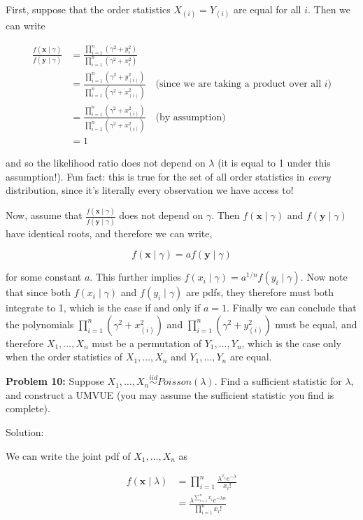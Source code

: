 \documentclass[
  letterpaper,
  DIV=11,
  numbers=noendperiod]{scrreprt}
\begin{document}
First, suppose that the order statistics \(X_{(i)} = Y_{(i)}\) are equal
for all \(i\). Then we can write

\begin{align*}
    \frac{f(\textbf{x} \mid \gamma)}{f(\textbf{y} \mid \gamma)} & = \frac{\prod_{i = 1}^n  (\gamma^2 + y_i^2)}{\prod_{i = 1}^n  (\gamma^2 + x_i^2)} \\
    & = \frac{\prod_{i = 1}^n  (\gamma^2 + y_{(i)}^2)}{\prod_{i = 1}^n  (\gamma^2 + x_{(i)}^2)} \quad \text{(since we are taking a product over all $i$)} \\
    & = \frac{\prod_{i = 1}^n  (\gamma^2 + x_{(i)}^2)}{\prod_{i = 1}^n  (\gamma^2 + x_{(i)}^2)} \quad \text{(by assumption)} \\
    & = 1
\end{align*}

and so the likelihood ratio does not depend on \(\lambda\) (it is equal
to 1 under this assumption!). Fun fact: this is true for the set of all
order statistics in \emph{every} distribution, since it's literally
every observation we have access to!

Now, assume that
\(\frac{f(\textbf{x} \mid \gamma)}{f(\textbf{y} \mid \gamma)}\) does not
depend on \(\gamma\). Then \(f(\textbf{x} \mid \gamma)\) and
\(f(\textbf{y} \mid \gamma)\) have identical roots, and therefore we can
write,

\[
f(\textbf{x} \mid \gamma)  = a f(\textbf{y} \mid \gamma)
\]

for some constant \(a\). This further implies
\(f(x_i \mid \gamma) = a^{1/n} f(y_i \mid \gamma)\). Now note that since
both \(f(x_i \mid \gamma)\) and \(f(y_i \mid \gamma)\) are pdfs, they
therefore must both integrate to 1, which is the case if and only if
\(a = 1\). Finally we can conclude that the polynomials
\(\prod_{i = 1}^n  (\gamma^2 + x_{(i)}^2)\) and
\(\prod_{i = 1}^n  (\gamma^2 + y_{(i)}^2)\) must be equal, and therefore
\(X_1, \dots, X_n\) must be a permutation of \(Y_1, \dots, Y_n\), which
is the case only when the order statistics of \(X_1, \dots, X_n\) and
\(Y_1, \dots, Y_n\) are equal.

\textbf{Problem 10:} Suppose
\(X_1, \dots, X_n \overset{iid}{\sim} Poisson(\lambda)\). Find a
sufficient statistic for \(\lambda\), and construct a UMVUE (you may
assume the sufficient statistic you find is complete).

Solution:

We can write the joint pdf of \(X_1, \dots, X_n\) as

\begin{align*}
    f(\textbf{x} \mid \lambda) & = \prod_{i = 1}^n \frac{\lambda^{x_i} e^{-\lambda}}{x_i!} \\
    & = \frac{\lambda^{\sum_{i = 1}^n x_i} e^{-\lambda n}}{\prod_{i = 1}^n x_i !}
\end{align*}
\end{document}
